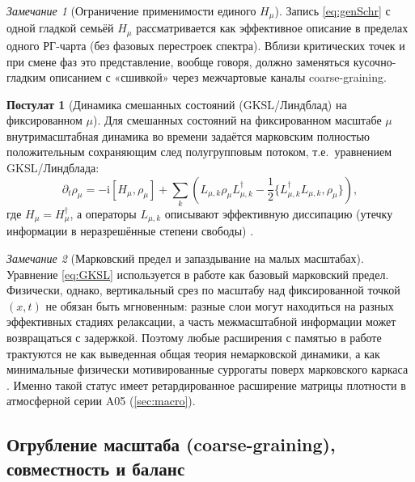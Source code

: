 \documentclass[11pt,a4paper]{article}
\newcommand{\ii}{\mathrm{i}}
\theoremstyle{definition}
\newtheorem{axiom}{Постулат}[section]
\theoremstyle{plain}
\theoremstyle{remark}
\newtheorem{remark}{Замечание}[section]
\begin{document}
\begin{remark}[Ограничение применимости единого $H_\mu$]\label{rem:Hmu_scope}
Запись \eqref{eq:genSchr} с одной гладкой семьёй $H_\mu$ рассматривается как эффективное описание
в пределах одного РГ-чарта (без фазовых перестроек спектра).
Вблизи критических точек и при смене фаз это представление, вообще говоря, должно заменяться
кусочно-гладким описанием с «сшивкой» через межчартовые каналы coarse-graining.
\end{remark}

\begin{axiom}[Динамика смешанных состояний (GKSL/Линдблад) на фиксированном $\mu$]\label{ax:GKSL}
Для смешанных состояний на фиксированном масштабе $\mu$ внутримасштабная динамика во времени задаётся
марковским полностью положительным сохраняющим след полугрупповым потоком, т.е.\ уравнением GKSL/Линдблада:
\begin{equation}\label{eq:GKSL}
\partial_t \rho_\mu
=
-\ii[H_\mu,\rho_\mu]
+\sum_k\left(
L_{\mu,k}\rho_\mu L_{\mu,k}^\dagger
-\frac12\{L_{\mu,k}^\dagger L_{\mu,k},\rho_\mu\}
\right),
\end{equation}
где $H_\mu=H_\mu^\dagger$, а операторы $L_{\mu,k}$ описывают эффективную диссипацию (утечку информации
в неразрешённые степени свободы) \cite{GoriniKossakowskiSudarshan1976GKSL,Lindblad1976Generators}.
\end{axiom}

\begin{remark}[Марковский предел и запаздывание на малых масштабах]\label{rem:memory}
Уравнение \eqref{eq:GKSL} используется в работе как базовый марковский предел.
Физически, однако, вертикальный срез по масштабу над фиксированной точкой $(x,t)$ не обязан быть мгновенным:
разные слои могут находиться на разных эффективных стадиях релаксации, а часть межмасштабной информации может возвращаться с задержкой.
Поэтому любые расширения с памятью в работе трактуются не как выведенная общая теория немарковской динамики,
а как минимальные физически мотивированные суррогаты поверх марковского каркаса \cite{BreuerPetruccione2002OpenQuantum,BreuerLainePiiloVacchini2016Colloquium}.
Именно такой статус имеет ретардированное расширение матрицы плотности в атмосферной серии A05 (\cref{sec:macro}).
\end{remark}

\subsection{Огрубление масштаба (coarse-graining), совместность и баланс}
\label{sec:axioms:coarse}
\end{document}
